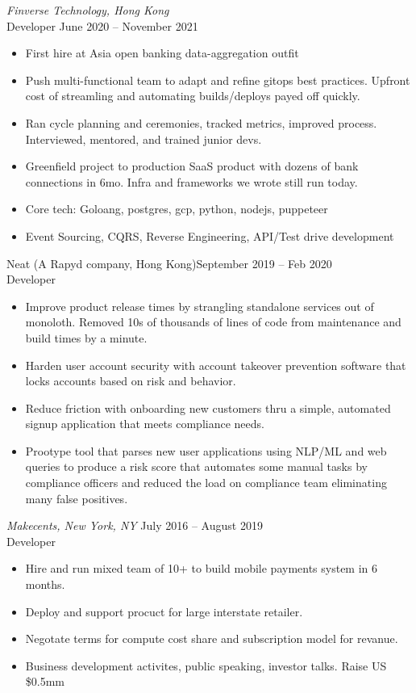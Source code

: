 \documentclass[10pt]{res} %
\begin{document}
\begin{resume}
{\sl Finverse Technology, Hong Kong} \\[2pt]
Developer \hfill June 2020 -- November 2021 
\begin{itemize} \itemsep -2pt %
\item First hire at Asia open banking data-aggregation outfit
\item Push multi-functional team to adapt and refine gitops best practices. Upfront cost of streamling and automating builds/deploys payed off quickly.
\item Ran cycle planning and ceremonies, tracked metrics, improved process. Interviewed, mentored, and  trained junior devs.
\item Greenfield project to production SaaS product with dozens of bank connections in 6mo. Infra and frameworks we wrote still run today.
\item Core tech: Goloang, postgres, gcp, python, nodejs, puppeteer
\item Event Sourcing, CQRS, Reverse Engineering, API/Test drive development
\end{itemize} 

\vspace{-6pt} %
Neat (A Rapyd company, Hong Kong)\hfill September 2019 -- Feb 2020 \\
Developer
\begin{itemize} 
\item Improve product release times by strangling standalone services out of monoloth. Removed 10s of thousands of lines of code from maintenance and build times by a minute.
\item Harden user account security with account takeover prevention software that locks accounts based on risk and behavior.
\item Reduce friction with onboarding new customers thru a simple, automated signup application that meets compliance needs.
\item Prootype tool that parses new user applications using NLP/ML and web queries to produce a risk score that automates some manual tasks by compliance officers and reduced the load on compliance team eliminating many false positives.
\end{itemize}
 
{\sl Makecents, New York, NY} \hfill July 2016 -- August 2019 \\
Developer
\begin{itemize}
\item Hire and run mixed team of 10+ to build mobile payments system in 6 months.
\item Deploy and support procuct for large interstate retailer. 
\item Negotate terms for compute cost share and subscription model for revanue.
\item Business development activites, public speaking, investor talks. Raise US \$0.5mm
\end{itemize}


\end{resume}
\end{document}
